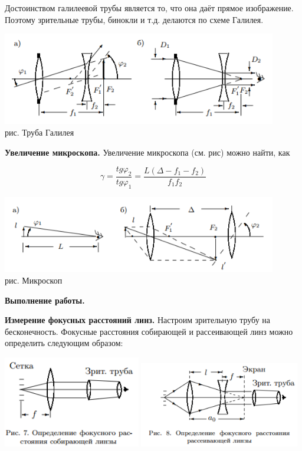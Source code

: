 \documentclass[12pt]{article}
\begin{document}
    Достоинством галилеевой трубы является то, что она даёт прямое
    изображение. Поэтому зрительные трубы, бинокли и т.д. делаются по
    схеме Галилея.
    
    \begin{center}
    	\includegraphics[width=12cm]{theory2.png}\\
    	рис. Труба Галилея
    \end{center}
    
    \textbf{Увеличение микроскопа.} Увеличение микроскопа (см. рис) можно найти, как
    
    \begin{equation}
	    \gamma = \frac{tg \varphi_2}{tg \varphi_1} = \frac{L (\Delta - f_1 - f_2)}{f_1 f_2}
    \end{equation}
    
    \begin{center}
    	\includegraphics[width=12cm]{theory3.png}\\
    	рис. Микроскоп
    \end{center}
    
    \begin{center}
    	\textbf{\large Выполнение работы.}
    \end{center}
    
    \textbf{Измерение фокусных расстояний линз.} Настроим зрительную трубу на бесконечность. Фокусные расстояния собирающей и рассеивающей линз можно определить следующим образом:
    
    \includegraphics[width=6cm]{focus+.png}
    \includegraphics[width=7cm]{focus-.png}
    
\end{document}
